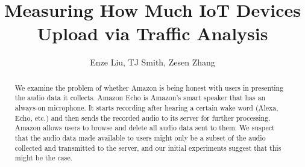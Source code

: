 \documentclass[sigconf,anonymous=false]{acmart}
\begin{document}
\title{Measuring How Much IoT Devices Upload via Traffic Analysis} %
\author{Enze Liu, TJ Smith, Zesen Zhang}


\begin{abstract}
We examine the problem of whether Amazon is being honest with users in presenting the audio data it collects. Amazon Echo is Amazon's smart speaker that has an always-on microphone. It starts recording after hearing a certain wake word (Alexa, Echo, etc.) and then sends the recorded audio to its server for further processing. Amazon allows users to browse and delete all audio data sent to them. We suspect that the audio data made available to users might only be a subset of the audio collected and transmitted to the server, and our initial experiments suggest that this might be the case.
\end{abstract}




\maketitle




\end{document}
